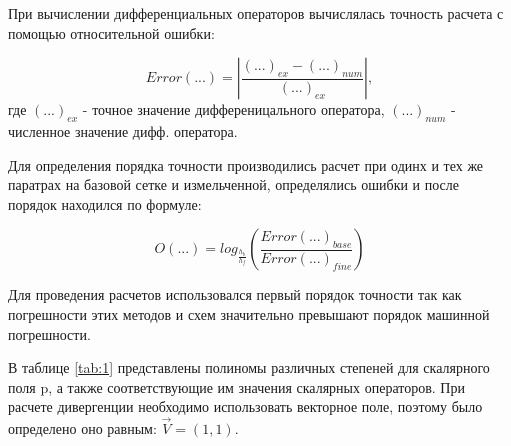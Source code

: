 При вычислении дифференциальных операторов вычислялась точность расчета с помощью относительной ошибки:

$$Error(...) = |\frac{(...)_{ex}-(...)_{num}}{(...)_{ex}}|,$$
где $(...)_{ex}$ - точное значение дифференицального оператора, $(...)_{num}$ - численное значение дифф. оператора.

Для определения порядка точности производились расчет при одинх и тех же паратрах на базовой сетке и измельченной, определялись ошибки и после порядок находился по формуле:

\begin{equation}
    O(...) = log_\frac{h_{b}}{h_{f}} (\frac{Error(...)_{base}}{Error(...)_{fine}})
\end{equation}

Для проведения расчетов использовался первый порядок точности так как погрешности этих методов и схем значительно превышают порядок машинной погрешности.


В таблице \ref{tab:1} представлены полиномы различных степеней для скалярного поля p, а также соответствующие им значения скалярных операторов. При расчете дивергенции необходимо использовать векторное поле, поэтому было определено оно равным: $\vec{V} = (1,1)$.


\begin{table}[H]
    \centering
    \caption{Виды полиномов используемых в дальнеших расчетах с точными операторами}
    
    \label{tab:1}
\end{table}


